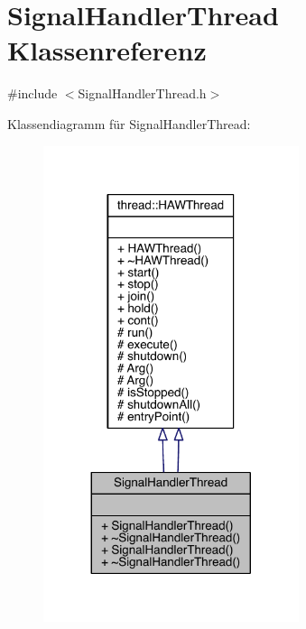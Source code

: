 \hypertarget{class_signal_handler_thread}{}\section{Signal\+Handler\+Thread Klassenreferenz}
\label{class_signal_handler_thread}


{\ttfamily \#include $<$Signal\+Handler\+Thread.\+h$>$}



Klassendiagramm für Signal\+Handler\+Thread\+:
\nopagebreak
\begin{figure}[H]
\begin{center}
\leavevmode
\includegraphics[width=212pt]{class_signal_handler_thread__inherit__graph}
\end{center}
\end{figure}


